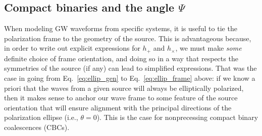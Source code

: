 \documentclass[aps,prd,twocolumn,superscriptaddress,preprintnumbers,floatfix,nofootinbib]{revtex4-2}
\begin{document}
% 
% 

\subsection{Compact binaries and the angle $\Psi$}

When modeling GW waveforms from specific systems, it is useful to tie the polarization frame to the geometry of the source.
This is advantageous because, in order to write out explicit expressions for $h_+$ and $h_\times$, we must make \emph{some} definite choice of frame orientation, and doing so in a way that respects the symmetries of the source (if any) can lead to simplified expressions.
That was the case in going from Eq.~\eqref{eq:ellip_gen} to Eq.~\eqref{eq:ellip_frame} above: if we know a priori that the waves from a given source will always be elliptically polarized, then it makes sense to anchor our wave frame to some feature of the source orientation that will ensure alignment with the principal directions of the polarization ellipse (i.e., $\theta=0$).
This is the case for nonprecessing compact binary coalescences (CBCs).
\end{document}
